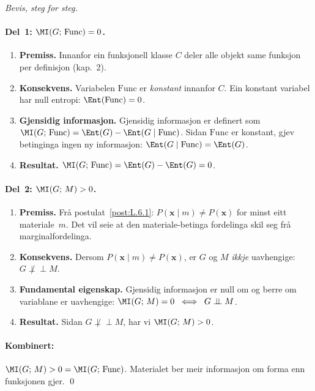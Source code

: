 \begin{proof}[Bevis, steg for steg]

\paragraph{Del~1: $\MI(G;\, \mathrm{Func}) = 0$.}%
\begin{enumerate}
  \item \textbf{Premiss.}\;
    Innanfor ein funksjonell klasse $C$ deler alle objekt same
    funksjon per definisjon (kap.~2).
  \item \textbf{Konsekvens.}\;
    Variabelen $\mathrm{Func}$ er \emph{konstant} innanfor $C$.
    Ein konstant variabel har null entropi:
    $\Ent(\mathrm{Func}) = 0$.
  \item \textbf{Gjensidig informasjon.}\;
    Gjensidig informasjon er definert som
    $\MI(G;\, \mathrm{Func}) = \Ent(G) -
    \Ent(G \mid \mathrm{Func})$.
    Sidan $\mathrm{Func}$ er konstant, gjev betinginga ingen ny
    informasjon:
    $\Ent(G \mid \mathrm{Func}) = \Ent(G)$.
  \item \textbf{Resultat.}\;
    $\MI(G;\, \mathrm{Func}) = \Ent(G) - \Ent(G) = 0$.
\end{enumerate}

\paragraph{Del~2: $\MI(G;\, M) > 0$.}%
\begin{enumerate}
  \item \textbf{Premiss.}\;
    Frå postulat~\ref{post:L.6.1}:
    $P(\bm{x} \mid m) \neq P(\bm{x})$ for minst eitt
    materiale~$m$. Det vil seie at den materiale-betinga
    fordelinga skil seg frå marginalfordelinga.
  \item \textbf{Konsekvens.}\;
    Dersom $P(\bm{x} \mid m) \neq P(\bm{x})$, er $G$ og $M$
    \emph{ikkje} uavhengige: $G \not\perp\!\!\!\perp M$.
  \item \textbf{Fundamental eigenskap.}\;
    Gjensidig informasjon er null om og berre om variablane er
    uavhengige:
    $\MI(G;\, M) = 0 \;\iff\; G \perp\!\!\!\perp M$.
  \item \textbf{Resultat.}\;
    Sidan $G \not\perp\!\!\!\perp M$, har vi $\MI(G;\, M) > 0$.
\end{enumerate}

\paragraph{Kombinert:}
$\MI(G;\, M) > 0 = \MI(G;\, \mathrm{Func})$. Materialet ber meir
informasjon om forma enn funksjonen gjer. \qed
\end{proof}

